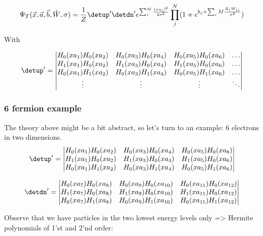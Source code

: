 \begin{equation}
\label{eq:wf_form}
\Psi_T(\vec{x},\vec{a},\vec{b},\hat{W},\sigma)=\frac{1}{Z}\detup'\detdn' e^{\sum_i^M \frac{(xa_i)^2}{2\sigma^2}} \prod_j^N (1+ e^{b_j + \sum_iM \frac{X_i W_{ij}}{\sigma^2}})
\end{equation}

With 

\begin{equation}
\detup'=
\begin{vmatrix} 
H_{0}(xa_1)H_{0}(xa_2)&H_{0}(xa_3)H_{0}(xa_4)&H_{0}(xa_5)H_{0}(xa_6)&\hdots \\
H_{1}(xa_1)H_{0}(xa_2)&H_{1}(xa_3)H_{0}(xa_4)&H_{1}(xa_5)H_{0}(xa_6)&\hdots \\
H_{0}(xa_1)H_{1}(xa_2)&H_{0}(xa_3)H_{1}(xa_4)&H_{0}(xa_5)H_{1}(xa_6)&\hdots \\
\vdots&\vdots&\vdots&\ddots
\end{vmatrix}
\end{equation}

\subsubsection{6 fermion example}
The theory above might be a bit abstract, so let's turn to an example: 6 electrons in two dimensions. 
\begin{equation}
\detup'=
\begin{vmatrix} 
H_{0}(xa_1)H_{0}(xa_2)&H_{0}(xa_3)H_{0}(xa_4)&H_{0}(xa_5)H_{0}(xa_6)\\
H_{1}(xa_1)H_{0}(xa_2)&H_{1}(xa_3)H_{0}(xa_4)&H_{1}(xa_5)H_{0}(xa_6)\\
H_{0}(xa_1)H_{1}(xa_2)&H_{0}(xa_3)H_{1}(xa_4)&H_{0}(xa_5)H_{1}(xa_6)
\end{vmatrix}
\end{equation}

\begin{equation}
\detdn'=
\begin{vmatrix} 
H_{0}(xa_7)H_{0}(xa_8)&H_{0}(xa_9)H_{0}(xa_{10})&H_{0}(xa_{11})H_{0}(xa_{12})\\
H_{1}(xa_7)H_{0}(xa_8)&H_{1}(xa_9)H_{0}(xa_{10})&H_{1}(xa_{11})H_{0}(xa_{12})\\
H_{0}(xa_7)H_{1}(xa_8)&H_{0}(xa_9)H_{1}(xa_{10})&H_{0}(xa_{11})H_{1}(xa_{12})
\end{vmatrix}
\end{equation}

Observe that we have particles in the two lowest energy levels only => Hermite polynomials of 1'st and 2'nd order:


